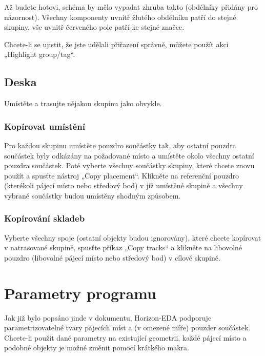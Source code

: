 \documentclass[letterpaper,10pt,czech]{sphinxmanual}
\begin{document}
Až budete hotovi, schéma by mělo vypadat zhruba takto (obdélníky přidány pro názornost). Všechny komponenty uvnitř žlutého obdélníku patří do stejné skupiny, vše uvnitř červeného pole patří ke stejné značce.

\noindent{}

Chcete-li se ujistit, že jste udělali přiřazení správně, můžete použít akci „Highlight group/tag“.


\section{Deska}
\label{\detokenize{copy-layout-placement_cz:deska}}
Umístěte a trasujte nějakou skupinu jako obvykle.


\subsection{Kopírovat umístění}
\label{\detokenize{copy-layout-placement_cz:kopirovat-umisteni}}
Pro každou skupinu umístěte pouzdro součástky tak, aby ostatní pouzdra součástek byly odkázány na požadované místo a umístěte okolo všechny ostatní pouzdra součástek. Poté vyberte všechny součástky skupiny, které chcete znovu použít a spusťte nástroj „Copy placement“. Klikněte na referenční pouzdro (kterékoli pájecí místo nebo středový bod) v již umístěné skupině a všechny vybrané součástky budou umístěny shodným způsobem.


\subsection{Kopírování skladeb}
\label{\detokenize{copy-layout-placement_cz:kopirovani-skladeb}}
Vyberte všechny spoje (ostatní objekty budou ignorovány), které chcete kopírovat
v natrasované skupině, spusťte příkaz „Copy tracks“ a klikněte na libovolné pouzdro
(libovolné pájecí místo nebo středový bod) v cílové skupině.


\chapter{Parametry programu}
\label{\detokenize{parameter-programs_cz:parametry-programu}}\label{\detokenize{parameter-programs_cz::doc}}
Jak již bylo popsáno jinde v dokumentu, Horizon-EDA podporuje parametrizovatelné tvary pájecích míst
a (v omezené míře) pouzder součástek. Chcete-li použít dané parametry na existující geometrii, každé pájecí místo a podobné objekty je možné změnit pomocí krátkého makra.
\end{document}
